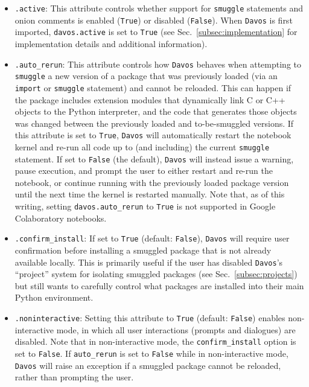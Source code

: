 \documentclass[preprint,12pt,a4paper]{elsarticle}
\begin{document}
\begin{itemize}
\item \texttt{.active}: This attribute controls whether support for \texttt{smuggle}
  statements and onion comments is enabled (\texttt{True}) or
  disabled (\texttt{False}).  When \texttt{Davos} is first imported,
  \texttt{davos.active} is set to \texttt{True} (see Sec.~\ref{subsec:implementation} for implementation details and additional information).

\item \texttt{.auto\_rerun}: This attribute controls how
  \texttt{Davos} behaves when attempting to \texttt{smuggle} a new
  version of a package that was previously loaded (via an \texttt{import} or \texttt{smuggle} statement) and cannot be
  reloaded. This can happen if the package includes extension modules
  that dynamically link C or C++ objects to the Python interpreter,
  and the code that generates those objects was changed between the
  previously loaded and to-be-smuggled versions.  If this attribute
  is set to \texttt{True}, \texttt{Davos} will automatically restart
  the notebook kernel and re-run all code up to (and including) the
  current \texttt{smuggle} statement. If set to \texttt{False} (the default),
  \texttt{Davos} will instead issue a warning, pause execution, and
  prompt the user to either restart and re-run the notebook, or
  continue running with the previously loaded package version until
  the next time the kernel is restarted manually.  Note that, as of
  this writing, setting \texttt{davos.auto\_rerun} to \texttt{True} is not
  supported in Google Colaboratory notebooks.

\item \texttt{.confirm\_install}: If set to \texttt{True} (default:
  \texttt{False}), \texttt{Davos} will require user confirmation
  before installing a smuggled package that is not already
  available locally. This is primarily useful if the user has disabled
  \texttt{Davos}'s ``project'' system for isolating smuggled packages (see
  Sec.~\ref{subsec:projects}) but still wants to carefully control what
  packages are installed into their main Python environment.

\item \texttt{.noninteractive}: Setting this attribute to
  \texttt{True} (default: \texttt{False}) enables non-in\-ter\-act\-ive
  mode, in which all user interactions (prompts and dialogues) are
  disabled. Note that in non-interactive mode, the
  \texttt{confirm\_install} option is set to \texttt{False}.  If
  \texttt{auto\_rerun} is set to \texttt{False} while in non-interactive
  mode, \texttt{Davos} will raise an exception if a smuggled package
  cannot be reloaded, rather than prompting the user.


\end{itemize}
\end{document}
